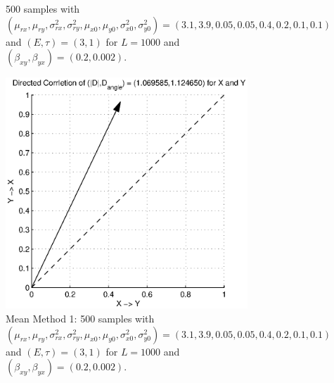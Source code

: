 \documentclass[a4paper,11pt]{article}
\begin{document}
\begin{figure}[h!t]
\begin{subfigure}[b]{0.4\textwidth}
\caption{500 samples with $\left(\mu_{rx},\mu_{ry},\sigma^2_{rx},\sigma^2_{ry},\mu_{x0},\mu_{y0},\sigma^2_{x0},\sigma^2_{y0}\right) = \left(3.1,3.9,0.05,0.05,0.4,0.2,0.1,0.1\right)$ and $\left(E,\tau\right)=\left(3,1\right)$ for $L=1000$ and $(\beta_{xy},\beta_{yx})=(0.2,0.002)$.}
\end{subfigure}
\caption{}
\end{figure}
\begin{figure}[h!t]
\centering
\begin{subfigure}[b]{0.4\textwidth}
\label{fig:SugEx2DCORR_mean1}
\includegraphics[scale=0.55]{graphics/SugEx2DCORR_mean1.eps}
\caption{Mean Method 1: 500 samples with $\left(\mu_{rx},\mu_{ry},\sigma^2_{rx},\sigma^2_{ry},\mu_{x0},\mu_{y0},\sigma^2_{x0},\sigma^2_{y0}\right) = \left(3.1,3.9,0.05,0.05,0.4,0.2,0.1,0.1\right)$ and $\left(E,\tau\right)=\left(3,1\right)$ for $L=1000$ and $(\beta_{xy},\beta_{yx})=(0.2,0.002)$.}
\end{subfigure}
\begin{subfigure}[b]{0.4\textwidth}
\label{fig:SugEx2DCORR_mean2}

\end{subfigure}
\end{figure}
\end{document}
